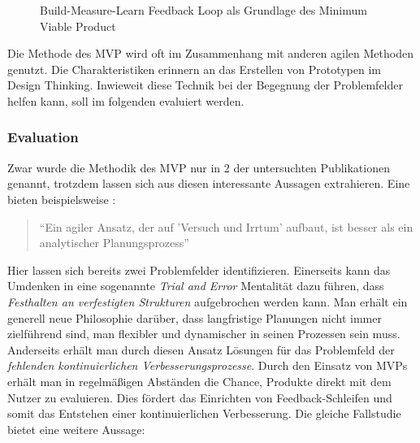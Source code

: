 \begin{figure}[H]
	\centering
	\caption[Build-Measure-Learn Feedback Loop als Grundlage des Minimum Viable Product]{Build-Measure-Learn Feedback Loop als Grundlage des Minimum Viable Product \protect \cite[S. 103]{grote_fuhrungsinstrumente_2018}}
	\label{fig:mvploop}
\end{figure}

Die Methode des MVP wird oft im Zusammenhang mit anderen agilen Methoden genutzt. Die Charakteristiken erinnern an das Erstellen von Prototypen im Design Thinking. Inwieweit diese Technik bei der Begegnung der Problemfelder helfen kann, soll im folgenden evaluiert werden.

\subsubsection{Evaluation}

Zwar wurde die Methodik des MVP nur in 2 der untersuchten Publikationen genannt, trotzdem lassen sich aus diesen interessante Aussagen extrahieren. Eine bieten beispielsweise :

\begin{quote}
	``Ein agiler Ansatz, der auf 'Versuch und Irrtum' aufbaut, ist besser als ein analytischer Planungsprozess'' \cite[S. 15]{chanias_digital_2018}
\end{quote}

Hier lassen sich bereits zwei Problemfelder identifizieren. Einerseits kann das Umdenken in eine sogenannte \textit{Trial and Error} Mentalität dazu führen, dass \textit{Festhalten an verfestigten Strukturen} aufgebrochen werden kann. Man erhält ein generell neue Philosophie darüber, dass langfristige Planungen nicht immer zielführend sind, man flexibler und dynamischer in seinen Prozessen sein muss. Anderseits erhält man durch diesen Ansatz Lösungen für das Problemfeld der \textit{fehlenden kontinuierlichen Verbesserungsprozesse}. Durch den Einsatz von MVPs erhält man in regelmäßigen Abständen die Chance, Produkte direkt mit dem Nutzer zu evaluieren. Dies fördert das Einrichten von Feedback-Schleifen und somit das Entstehen einer kontinuierlichen Verbesserung. Die gleiche Fallstudie bietet eine weitere Aussage:

